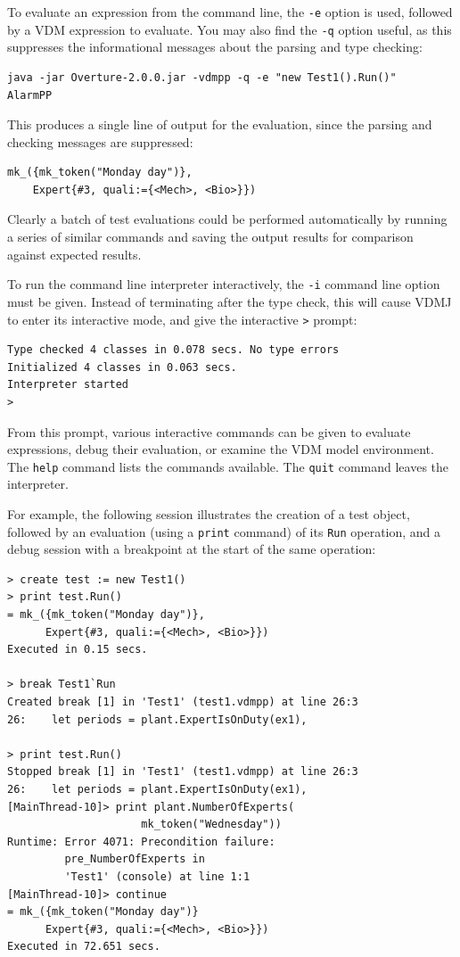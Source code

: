 To evaluate an expression from the command line, the \verb|-e| option
is used, followed by a VDM expression to evaluate. You may also find
the \verb|-q| option useful, as this suppresses the informational
messages about the parsing and type checking:

\begin{lstlisting}
java -jar Overture-2.0.0.jar -vdmpp -q -e "new Test1().Run()"
AlarmPP
\end{lstlisting}

\noindent This produces a single line of output for the evaluation, since the
parsing and checking messages are suppressed:

\begin{lstlisting}
mk_({mk_token("Monday day")},
	Expert{#3, quali:={<Mech>, <Bio>}})
\end{lstlisting}

Clearly a batch of test evaluations could be performed automatically by running
a series of similar commands and saving the output results for comparison
against expected results.

To run the command line interpreter interactively, the \verb|-i| command line
option must be given. Instead of terminating after the type check, this will
cause VDMJ to enter its interactive mode, and give the interactive \verb|>|
prompt:

\begin{lstlisting}
Type checked 4 classes in 0.078 secs. No type errors
Initialized 4 classes in 0.063 secs.
Interpreter started
>
\end{lstlisting}

\noindent From this prompt, various interactive commands can be given to
evaluate expressions, debug their evaluation, or examine the VDM model environment.
The \verb|help| command lists the commands available. The \verb|quit| command
leaves the interpreter.

For example, the following session illustrates the creation of a test object,
followed by an evaluation (using a \texttt{print} command)
of its \verb|Run| operation, and a debug
session with a breakpoint at the start of the same operation:

\begin{lstlisting}
> create test := new Test1()
> print test.Run()
= mk_({mk_token("Monday day")},
      Expert{#3, quali:={<Mech>, <Bio>}})
Executed in 0.15 secs.

> break Test1`Run
Created break [1] in 'Test1' (test1.vdmpp) at line 26:3
26:    let periods = plant.ExpertIsOnDuty(ex1),

> print test.Run()
Stopped break [1] in 'Test1' (test1.vdmpp) at line 26:3
26:    let periods = plant.ExpertIsOnDuty(ex1),
[MainThread-10]> print plant.NumberOfExperts(
                     mk_token("Wednesday"))
Runtime: Error 4071: Precondition failure:
         pre_NumberOfExperts in
         'Test1' (console) at line 1:1
[MainThread-10]> continue
= mk_({mk_token("Monday day")}
      Expert{#3, quali:={<Mech>, <Bio>}})
Executed in 72.651 secs.
\end{lstlisting}


